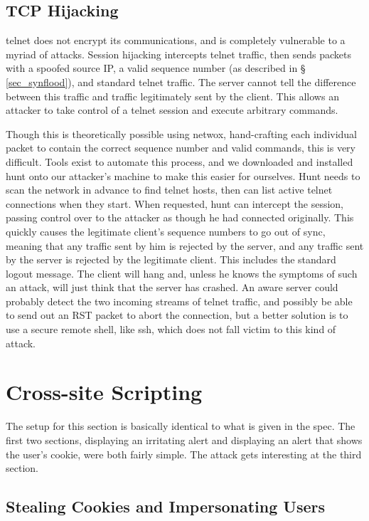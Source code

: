\subsection{TCP Hijacking}

telnet does not encrypt its communications, and is completely vulnerable to a myriad of attacks. Session hijacking
intercepts telnet traffic, then sends packets with a spoofed source IP, a valid sequence number (as described in \S
\ref{sec_synflood}), and standard telnet traffic. The server cannot tell the difference between this traffic and traffic
legitimately sent by the client. This allows an attacker to take control of a telnet session and execute arbitrary
commands.

Though this is theoretically possible using netwox, hand-crafting each individual packet to contain the correct sequence
number and valid commands, this is very difficult. Tools exist to automate this process, and we downloaded and installed
hunt onto our attacker's machine to make this easier for ourselves. Hunt needs to scan the network in advance to find
telnet hosts, then can list active telnet connections when they start. When requested, hunt can intercept the session,
passing control over to the attacker as though he had connected originally. This quickly causes the legitimate client's
sequence numbers to go out of sync, meaning that any traffic sent by him is rejected by the server, and any traffic sent
by the server is rejected by the legitimate client. This includes the standard logout message. The client will hang and,
unless he knows the symptoms of such an attack, will just think that the server has crashed. An aware server could
probably detect the two incoming streams of telnet traffic, and possibly be able to send out an RST packet to abort the
connection, but a better solution is to use a secure remote shell, like ssh, which does not fall victim to this kind of
attack.

\section{Cross-site Scripting}

The setup for this section is basically identical to what is given in the spec. The first two sections, displaying an
irritating alert and displaying an alert that shows the user's cookie, were both fairly simple. The attack gets
interesting at the third section.

\subsection{Stealing Cookies and Impersonating Users}

